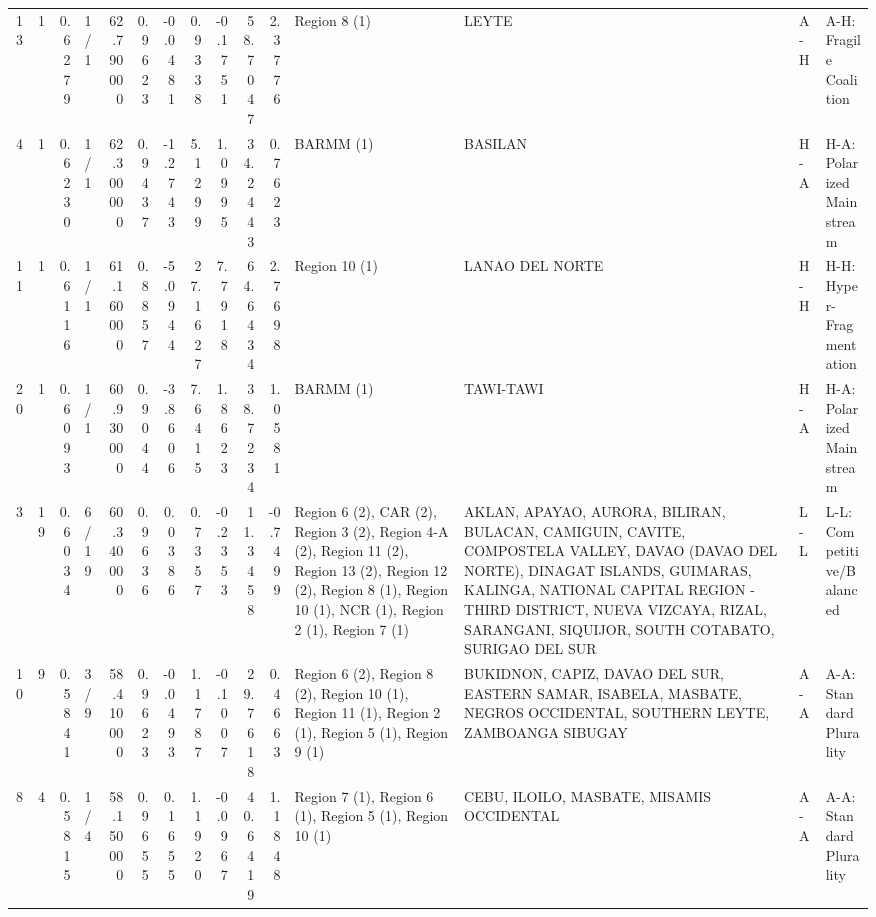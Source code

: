 \begin{tabular}{rrrlrrrrrrrllll}
13 & 1 & {\cellcolor[HTML]{F7AF91}} \color[HTML]{000000} 0.6279 & 1/1 & {\cellcolor[HTML]{F7AF91}} \color[HTML]{000000} 62.790000 & 0.9623 & -0.0481 & 0.9338 & -0.1751 & 58.7047 & 2.3776 & Region 8 (1) & LEYTE & A-H & A-H: Fragile Coalition \\
4 & 1 & {\cellcolor[HTML]{F7B599}} \color[HTML]{000000} 0.6230 & 1/1 & {\cellcolor[HTML]{F7B599}} \color[HTML]{000000} 62.300000 & 0.9437 & -1.2743 & 5.1299 & 1.0995 & 34.2443 & 0.7623 & BARMM (1) & BASILAN & H-A & H-A: Polarized Mainstream \\
11 & 1 & {\cellcolor[HTML]{F5C4AC}} \color[HTML]{000000} 0.6116 & 1/1 & {\cellcolor[HTML]{F5C4AC}} \color[HTML]{000000} 61.160000 & 0.8857 & -5.0944 & 27.1627 & 7.7918 & 64.6434 & 2.7698 & Region 10 (1) & LANAO DEL NORTE & H-H & H-H: Hyper-Fragmentation \\
20 & 1 & {\cellcolor[HTML]{F4C6AF}} \color[HTML]{000000} 0.6093 & 1/1 & {\cellcolor[HTML]{F4C6AF}} \color[HTML]{000000} 60.930000 & 0.9044 & -3.8606 & 7.6415 & 1.8623 & 38.7234 & 1.0581 & BARMM (1) & TAWI-TAWI & H-A & H-A: Polarized Mainstream \\
3 & 19 & {\cellcolor[HTML]{F1CCB8}} \color[HTML]{000000} 0.6034 & 6/19 & {\cellcolor[HTML]{F1CCB8}} \color[HTML]{000000} 60.340000 & 0.9636 & 0.0386 & 0.7357 & -0.2353 & 11.3458 & -0.7499 & Region 6 (2), CAR (2), Region 3 (2), Region 4-A (2), Region 11 (2), Region 13 (2), Region 12 (2), Region 8 (1), Region 10 (1), NCR (1), Region 2 (1), Region 7 (1) & AKLAN, APAYAO, AURORA, BILIRAN, BULACAN, CAMIGUIN, CAVITE, COMPOSTELA VALLEY, DAVAO (DAVAO DEL NORTE), DINAGAT ISLANDS, GUIMARAS, KALINGA, NATIONAL CAPITAL REGION - THIRD DISTRICT, NUEVA VIZCAYA, RIZAL, SARANGANI, SIQUIJOR, SOUTH COTABATO, SURIGAO DEL SUR & L-L & L-L: Competitive/Balanced \\
10 & 9 & {\cellcolor[HTML]{E2DAD5}} \color[HTML]{000000} 0.5841 & 3/9 & {\cellcolor[HTML]{E1DAD6}} \color[HTML]{000000} 58.410000 & 0.9623 & -0.0493 & 1.1787 & -0.1007 & 29.7618 & 0.4663 & Region 6 (2), Region 8 (2), Region 10 (1), Region 11 (1), Region 2 (1), Region 5 (1), Region 9 (1) & BUKIDNON, CAPIZ, DAVAO DEL SUR, EASTERN SAMAR, ISABELA, MASBATE, NEGROS OCCIDENTAL, SOUTHERN LEYTE, ZAMBOANGA SIBUGAY & A-A & A-A: Standard Plurality \\
8 & 4 & {\cellcolor[HTML]{DFDBD9}} \color[HTML]{000000} 0.5815 & 1/4 & {\cellcolor[HTML]{DFDBD9}} \color[HTML]{000000} 58.150000 & 0.9655 & 0.1655 & 1.1920 & -0.0967 & 40.6419 & 1.1848 & Region 7 (1), Region 6 (1), Region 5 (1), Region 10 (1) & CEBU, ILOILO, MASBATE, MISAMIS OCCIDENTAL & A-A & A-A: Standard Plurality \\

\end{tabular}
